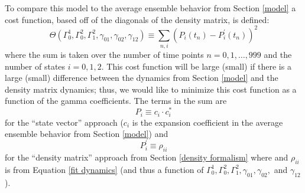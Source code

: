 To compare this model to the average ensemble behavior from Section \ref{model} a cost function, based off of the diagonals of the density matrix, is defined:
\begin{equation}
\Theta(\Gamma^{1}_{0},\Gamma^{2}_{0},\Gamma^{2}_{1},\gamma_{01},\gamma_{02},\gamma_{12})\equiv
\sum_{n,i}
\left(
P_{i}(t_n) - P^{\prime}_{i}(t_n)
\right)^2
\label{the cost function}
\end{equation}
where the sum is taken over the number of time points $n=0,1,\ldots,999$ and the number of states $i=0,1,2$. This cost function will be large (small) if there is a large (small) difference between the dynamics from Section \ref{model} and the density matrix dynamics; thus, we would like to minimize this cost function as a function of the gamma coefficients. The terms in the sum are
\begin{equation}
P_i
\equiv
c_i \cdot c^{*}_i
\end{equation}
for the ``state vector'' approach ($c_i$ is the expansion coefficient in the average ensemble behavior from Section \ref{model}) and
\begin{equation}
P^{\prime}_{i}\equiv
\rho_{ii}
\end{equation}
 for the ``density matrix'' approach from Section \ref{density formalism} where  and $\rho_{ii}$ is from Equation \ref{fit dynamics} (and thus a function of $\Gamma^{1}_{0},\Gamma^{2}_{0},\Gamma^{2}_{1},\gamma_{01},\gamma_{02},$ and $\gamma_{12}$).

